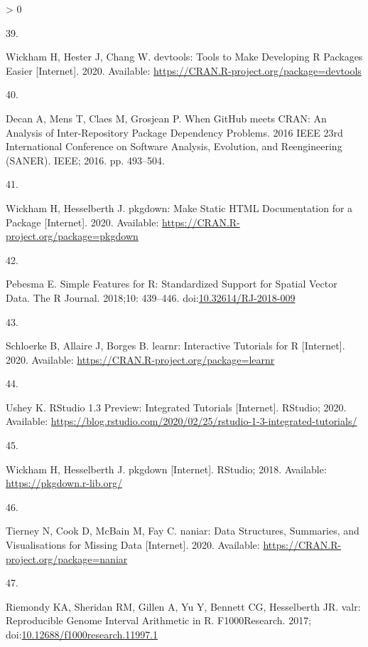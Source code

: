 \documentclass[10pt,letterpaper]{article}
\newlength{\csllabelwidth}
\newlength{\cslhangindent}
\newenvironment{CSLReferences}[3] %
 {%
  \setlength{\parindent}{0pt}
  \ifodd #1 \everypar{\setlength{\hangindent}{\cslhangindent}}\ignorespaces\fi
  \ifnum #2 > 0
  \setlength{\parskip}{#2\baselineskip}
  \fi
 }%
 {}
\newcommand{\CSLLeftMargin}[1]{\parbox[t]{\csllabelwidth}{#1}}
\newcommand{\CSLRightInline}[1]{\parbox[t]{\linewidth - \csllabelwidth}{#1}}
\begin{document}
\begin{CSLReferences}{0}{0}
\leavevmode\hypertarget{ref-devtools}{}%
\CSLLeftMargin{39. }
\CSLRightInline{Wickham H, Hester J, Chang W. {devtools: Tools to Make
Developing R Packages Easier} {[}Internet{]}. 2020. Available:
\url{https://CRAN.R-project.org/package=devtools}}

\leavevmode\hypertarget{ref-decan2016}{}%
\CSLLeftMargin{40. }
\CSLRightInline{Decan A, Mens T, Claes M, Grosjean P. {When GitHub meets
CRAN: An Analysis of Inter-Repository Package Dependency Problems}.
{2016 IEEE 23rd International Conference on Software Analysis,
Evolution, and Reengineering (SANER)}. IEEE; 2016. pp. 493--504. }

\leavevmode\hypertarget{ref-pkgdown}{}%
\CSLLeftMargin{41. }
\CSLRightInline{Wickham H, Hesselberth J. {pkgdown: Make Static HTML
Documentation for a Package} {[}Internet{]}. 2020. Available:
\url{https://CRAN.R-project.org/package=pkgdown}}

\leavevmode\hypertarget{ref-sf}{}%
\CSLLeftMargin{42. }
\CSLRightInline{Pebesma E. {Simple Features for R: Standardized Support
for Spatial Vector Data}. {The R Journal}. 2018;10: 439--446.
doi:\href{https://doi.org/10.32614/RJ-2018-009}{10.32614/RJ-2018-009}}

\leavevmode\hypertarget{ref-learnr}{}%
\CSLLeftMargin{43. }
\CSLRightInline{Schloerke B, Allaire J, Borges B. {learnr: Interactive
Tutorials for R} {[}Internet{]}. 2020. Available:
\url{https://CRAN.R-project.org/package=learnr}}

\leavevmode\hypertarget{ref-ushey2020}{}%
\CSLLeftMargin{44. }
\CSLRightInline{Ushey K. {RStudio 1.3 Preview: Integrated Tutorials}
{[}Internet{]}. RStudio; 2020. Available:
\url{https://blog.rstudio.com/2020/02/25/rstudio-1-3-integrated-tutorials/}}

\leavevmode\hypertarget{ref-pkgdownweb}{}%
\CSLLeftMargin{45. }
\CSLRightInline{Wickham H, Hesselberth J. {pkgdown} {[}Internet{]}.
RStudio; 2018. Available: \url{https://pkgdown.r-lib.org/}}

\leavevmode\hypertarget{ref-naniar}{}%
\CSLLeftMargin{46. }
\CSLRightInline{Tierney N, Cook D, McBain M, Fay C. {naniar: Data
Structures, Summaries, and Visualisations for Missing Data}
{[}Internet{]}. 2020. Available:
\url{https://CRAN.R-project.org/package=naniar}}

\leavevmode\hypertarget{ref-valr}{}%
\CSLLeftMargin{47. }
\CSLRightInline{Riemondy KA, Sheridan RM, Gillen A, Yu Y, Bennett CG,
Hesselberth JR. {valr: Reproducible Genome Interval Arithmetic in R}.
F1000Research. 2017;
doi:\href{https://doi.org/10.12688/f1000research.11997.1}{10.12688/f1000research.11997.1}}


\end{CSLReferences}
\end{document}
